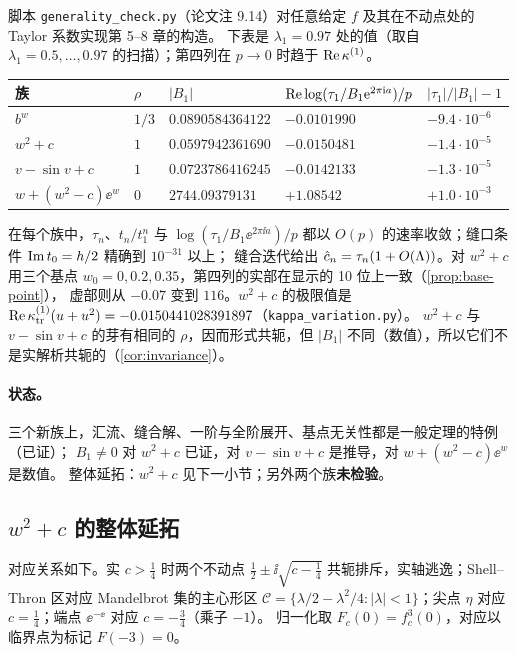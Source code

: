 \begin{example}[数值比较]\label{ch10:ex:numerics-table}
脚本 \texttt{generality\_check.py}（论文注 9.14）对任意给定 $f$ 及其在不动点处的 Taylor 系数实现第 5--8 章的构造。
下表是 $\lambda_1=0.97$ 处的值（取自 $\lambda_1=0.5,\dots,0.97$ 的扫描）；第四列在 $p\to0$ 时趋于 $\operatorname{Re}\kappa^{(1)}$。
\begin{center}\small
\begin{tabular}{lllll}
\toprule
族 & $\rho$ & $|B_1|$ & $\operatorname{Re}\log(\tau_1/B_1\mathrm{e}^{2\pi\mathrm{i} a})/p$ & $|\tau_1|/|B_1|-1$\\
\midrule
$b^w$ & $1/3$ & $0.0890584364122$ & $-0.0101990$ & $-9.4\cdot10^{-6}$\\
$w^2+c$ & $1$ & $0.0597942361690$ & $-0.0150481$ & $-1.4\cdot10^{-5}$\\
$v-\sin v+c$ & $1$ & $0.0723786416245$ & $-0.0142133$ & $-1.3\cdot10^{-5}$\\
$w+(w^2-c)\ee^w$ & $0$ & $2744.09379131$ & $+1.08542$ & $+1.0\cdot10^{-3}$\\
\bottomrule
\end{tabular}
\end{center}
在每个族中，$\tau_n$、$t_n/t_1^n$ 与 $\log(\tau_1/B_1\ee^{2\pi\ii a})/p$ 都以 $O(p)$ 的速率收敛；缝口条件 $\operatorname{Im} t_0=h/2$ 精确到 $10^{-31}$ 以上；
缝合迭代给出 $\hat c_n=\tau_n(1+O(\Lambda))$。对 $w^2+c$ 用三个基点 $w_0=0,0.2,0.35$，第四列的实部在显示的 10 位上一致（\cref{prop:base-point}），
虚部则从 $-0.07$ 变到 $116$。$w^2+c$ 的极限值是 $\operatorname{Re}\kappa_{\mathrm{tr}}^{(1)}(u+u^2)=-0.0150441028391897$（\texttt{kappa\_variation.py}）。
$w^2+c$ 与 $v-\sin v+c$ 的芽有相同的 $\rho$，因而形式共轭，但 $|B_1|$ 不同（数值），所以它们不是实解析共轭的（\cref{cor:invariance}）。
\end{example}

\paragraph{状态。}三个新族上，汇流、缝合解、一阶与全阶展开、基点无关性都是一般定理的特例（已证）；
$B_1\neq0$ 对 $w^2+c$ 已证，对 $v-\sin v+c$ 是推导，对 $w+(w^2-c)\ee^w$ 是数值。
整体延拓：$w^2+c$ 见下一小节；另外两个族\textbf{未检验}。

\subsection{$w^2+c$ 的整体延拓}

对应关系如下。实 $c>\tfrac14$ 时两个不动点 $\tfrac12\pm\ii\sqrt{c-\tfrac14}$ 共轭排斥，实轴逃逸；Shell--Thron 区对应 Mandelbrot 集的主心形区
$\mathcal C=\{\lambda/2-\lambda^2/4:|\lambda|<1\}$；尖点 $\eta$ 对应 $c=\tfrac14$；端点 $\ee^{-\ee}$ 对应 $c=-\tfrac34$（乘子 $-1$）。
归一化取 $F_c(0)=f_c^3(0)$，对应以临界点为标记 $F(-3)=0$。

